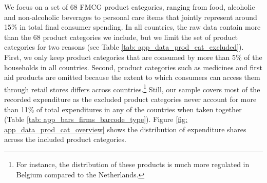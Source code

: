 We focus on a set of 68 FMCG product categories, ranging from food, alcoholic and non-alcoholic beverages to personal care items that jointly represent around 15\% in total final consumer spending. In all countries, the raw data contain more than the 68 product categories we include, but we limit the set of product categories for two reasons (see Table \ref{tab: app_data_prod_cat_excluded}). First, we only keep product categories that are consumed by more than 5\% of the households in all countries. Second, product categories such as medicines and first aid products are omitted because the extent to which consumers can access them through retail stores differs across countries.\footnote{For instance, the distribution of these products is much more regulated in Belgium compared to the Netherlands.} Still, our sample covers most of the recorded expenditure as the excluded product categories never account for more than 11\% of total expenditures in any of the countries when taken together (Table \ref{tab: app_bars_firms_barcode_type}). Figure \ref{fig: app_data_prod_cat_overview} shows the distribution of expenditure shares across the included product categories.

